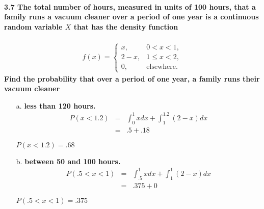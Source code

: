\documentclass{article}
\begin{document}
\pagebreak

\paragraph{3.7 The total number of hours, measured in units of 100 hours,
that a family runs a vacuum cleaner over a period of one year is a
continuous random variable $X$ that has the density function}
\begin{eqnarray*}
  f(x) = \left\{ \begin{array}{ll}
  	x, & 0 < x < 1,\\
	2-x, & 1 \leq x < 2,\\
	0, & \mbox{elsewhere.}
  \end{array}\right.
\end{eqnarray*}
\textbf{Find the probability that over a period of one year, a family 
runs their vacuum cleaner}
\begin{enumerate}
\item[a.] \textbf{less than 120 hours.}\\
\begin{eqnarray*}
  P(x < 1.2) & = & \int_0^1 xdx + \int_1^{1.2} (2-x)dx\\
             & = & .5 + .18
\end{eqnarray*}
\begin{center}
$\boxed{P(x <1.2) = .68}$
\end{center}

\item[b.] \textbf{between 50 and 100 hours.}\\
\begin{eqnarray*}
  P(.5 < x < 1) & = & \int_{.5}^1 xdx + \int_1^1 (2-x)dx\\
                  & = & .375 + 0
\end{eqnarray*}
\begin{center}
$\boxed{P(.5 < x < 1) = .375}$
\end{center}
\end{enumerate}
\end{document}
